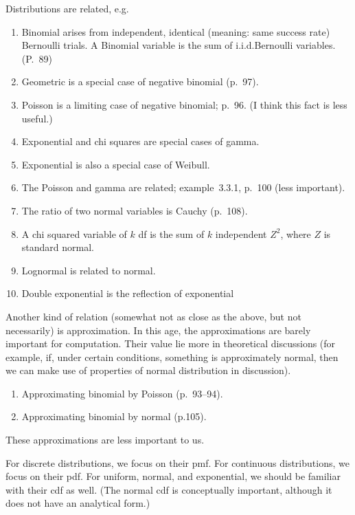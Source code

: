 \documentclass[12pt]{article}
\begin{document}
Distributions are related, e.g.
\begin{enumerate}
\item Binomial arises from independent, identical
    (meaning: same success rate) Bernoulli trials.
    A Binomial variable is the sum of i.i.d.\@ Bernoulli variables.
    (P.~89)
\item Geometric is a special case of negative binomial (p.~97).
\item Poisson is a limiting case of negative binomial;
    p.~96. (I think this fact is less useful.)
\item Exponential and chi squares are special cases of gamma.
\item Exponential is also a special case of Weibull.
\item The Poisson and gamma are related;
    example~3.3.1, p.~100 (less important).
\item The ratio of two normal variables is Cauchy (p.~108).
\item A chi squared variable of $k$ df is the sum of $k$
    independent $Z^2$, where $Z$ is standard normal.
\item Lognormal is related to normal.
\item Double exponential is the reflection of exponential
\end{enumerate}

Another kind of relation (somewhat not as close as the above, but not
necessarily) is approximation.
In this age, the approximations are barely important for computation.
Their value lie more in theoretical discussions (for example,
if, under certain conditions, something is approximately normal,
then we can make use of properties of normal distribution in discussion).
\begin{enumerate}
\item Approximating binomial by Poisson (p.~93--94).
\item Approximating binomial by normal (p.105).
\end{enumerate}
These approximations are less important to us.

For discrete distributions,
we focus on their pmf.
For continuous distributions, we focus on their pdf.
For uniform, normal, and exponential, we should be familiar with their cdf as
well. (The normal cdf is conceptually important, although it does not
have an analytical form.)
\end{document}
